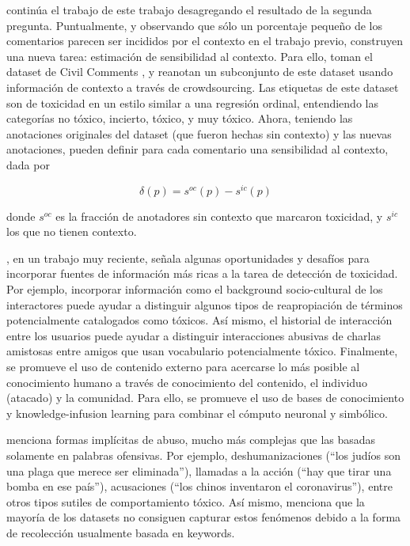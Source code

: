 \citet{xenos-2021-context} continúa el trabajo de este trabajo desagregando el resultado de la segunda pregunta. Puntualmente, y observando que sólo un porcentaje pequeño de los comentarios parecen ser incididos por el contexto en el trabajo previo, construyen una nueva tarea: estimación de sensibilidad al contexto. Para ello, toman el dataset de Civil Comments \cite{borkan2019civil}, y reanotan un subconjunto de este dataset usando información de contexto a través de crowdsourcing. Las etiquetas de este dataset son de toxicidad en un estilo similar a una regresión ordinal, entendiendo las categorías no tóxico, incierto, tóxico, y muy tóxico. Ahora, teniendo las anotaciones originales del dataset (que fueron hechas sin contexto) y las nuevas anotaciones, pueden definir para cada comentario una sensibilidad al contexto, dada por

\begin{equation}
    \delta(p) = s^{oc}(p) - s^{ic}(p)
\end{equation}

donde $s^{oc}$ es la fracción de anotadores sin contexto que marcaron toxicidad, y $s^{ic}$ los que no tienen contexto.

\citet{sheth2021defining}, en un trabajo muy reciente, señala algunas oportunidades y desafíos  para incorporar fuentes de información más ricas a la tarea de detección de toxicidad. Por ejemplo, incorporar información como el background socio-cultural de los interactores puede ayudar a distinguir algunos tipos de reapropiación de términos potencialmente catalogados como tóxicos. Así mismo, el historial de interacción entre los usuarios puede ayudar a distinguir interacciones abusivas de charlas amistosas entre amigos que usan vocabulario potencialmente tóxico. Finalmente, se promueve el uso de contenido externo para acercarse lo más posible al conocimiento humano a través de conocimiento del contenido, el individuo (atacado) y la comunidad. Para ello, se promueve el uso de bases de conocimiento y knowledge-infusion learning \cite{gaur2020infusion} para combinar el cómputo neuronal y simbólico.



\citet{wiegand2021implicitly} menciona formas implícitas de abuso, mucho más complejas que las basadas solamente en palabras ofensivas. Por ejemplo, deshumanizaciones (``los judíos son una plaga que merece ser eliminada''), llamadas a la acción (``hay que tirar una bomba en ese país''), acusaciones (``los chinos inventaron el coronavirus''), entre otros tipos sutiles de comportamiento tóxico. Así mismo, menciona que la mayoría de los datasets no consiguen capturar estos fenómenos debido a la forma de recolección usualmente basada en keywords.

